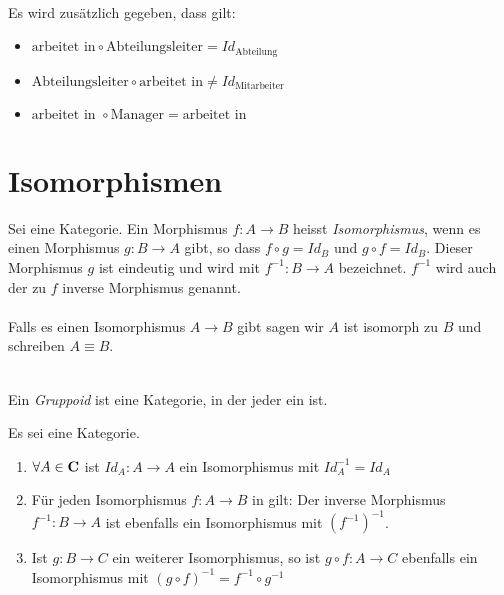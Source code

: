 \documentclass{article}
\renewcommand{\id}{\ensuremath{Id}}
\begin{document}
	 \begin{bsp}[Datenbanken]
		  \cite[Beispiel 2.2.33]{Bra} \\
		  
		 Es wird zus\"atzlich gegeben, dass gilt:
		 \begin{itemize}
			 \item \( \text{arbeitet \ in} \circ \text{Abteilungsleiter}= \id_\text{Abteilung}  \)
			 \item \( \text{Abteilungsleiter} \circ \text{arbeitet \ in} \neq \id_\text{Mitarbeiter}  \)
			 \item \( \text{arbeitet \ in }  \circ \text{Manager} = \text{arbeitet \ in } \)
		 \end{itemize}
	 \end{bsp}
	
	\section{Isomorphismen}
		
		\begin{defi}[Isomorphismus]
		 \cite[Definition 2.3.1]{Bra}
		Sei \CatC eine Kategorie. Ein Morphismus \( f: A \to B  \) heisst  \emph{Isomorphismus}, wenn es einen Morphismus \( g: B \to A \) gibt, so dass \( f \circ g  = \id_B \) und \( g \circ f = \id_B \). 
		Dieser Morphismus \( g \) ist eindeutig und wird mit \( f^{-1} :B \to A \) bezeichnet.
		\(f^{-1} \) wird auch der zu \( f \)  inverse Morphismus genannt.\\

		 \\

		Falls es einen Isomorphismus \( A \to B \) gibt sagen wir \( A \) ist isomorph zu \( B \) und schreiben \( A \equiv B \).
		\end{defi}
		
		\begin{defi}[Gruppoid]
		  \cite[Beispiel 2.2.34]{Bra} \\
		 Ein \emph{Gruppoid} ist eine Kategorie, in der jeder \Mor ein \Iso ist.
		\end{defi}
		  
		\begin{lem}
		   \cite[Lemma 2.3.9]{Bra}
		  Es sei \CatC eine Kategorie.
		\begin{enumerate}
			  \item \( \forall A \in \mathbf{C} \) ist \( \id_A :A \to A  \) ein Isomorphismus mit \( \id_A^{-1}=\id_A \)
			  \item F\"ur jeden Isomorphismus \( f: A \to B \) in \CatC gilt: Der inverse Morphismus \(f^{-1}: B \to A \) ist ebenfalls ein Isomorphismus mit \( \left( f^{-1} \right)^{-1} \).
			  \item Ist \(g: B \to C \) ein weiterer Isomorphismus, so ist \( g \circ f :A \to C \) ebenfalls ein Isomorphismus mit \( \left( g \circ f \right)^{-1} =f^{-1} \circ g^{-1} \)  
		  \end{enumerate}
		  	\end{lem}
		  	
\end{document}
